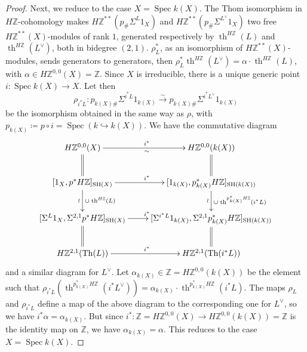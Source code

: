 \documentclass[10pt]{amsart}
\theoremstyle{definition}
\theoremstyle{plain}
\numberwithin{equation}{section}
\newcommand{\0}{\emptyset}
\newcommand{\Z}{{\mathbb Z}}
\newcommand{\Spec}{{\operatorname{Spec}}}
\newcommand{\SH}{{\operatorname{SH}}}
\newcommand{\Th}{{\operatorname{Th}}}
\renewcommand{\th}{{\operatorname{th}}}
\begin{document}
\begin{proof}
    Next, we reduce to the case $X=\Spec k(X)$. The Thom isomorphism in $H\mathbb{Z}$-cohomology makes $H\mathbb{Z}^{**}(p_{\#}\Sigma^L1_X)$ and $H\mathbb{Z}^{**}(p_{\#}\Sigma^{L^{\vee}}1_X)$ two free $H\mathbb{Z}^{**}(X)$-modules of rank $1$, generated respectively by $\th^{H\mathbb{Z}}(L)$ and $\th^{H\mathbb{Z}}(L^{\vee})$, both in bidegree $(2,1)$. $\rho_L^*$, as an isomorphism of $H\mathbb{Z}^{**}(X)$-modules, sends generators to generators, then $\rho_L^*\th^{H\mathbb{Z}}(L^{\vee})=\alpha \cdot \th^{H\mathbb{Z}}(L)$, with $\alpha \in H\mathbb{Z}^{0,0}(X)=\mathbb{Z}.$ Since $X$ is irreducible, there is a unique generic point $i:\Spec k(X) \to X$. Let then
    $$\rho_{i^*L}: p_{k(X)\#}\Sigma^{i^*L}1_{k(X)} \xrightarrow{\sim} p_{k(X)\#}\Sigma^{i^*L^{\vee}}1_{k(X)}$$
    be the isomorphism obtained in the same way as $\rho$, with $p_{k(X)}\coloneqq p \circ i =\Spec(k \hookrightarrow k(X))$. We have the commutative diagram
\[
 \xymatrix{
 H\Z^{0,0}(X)\ar@{=}[d]\ar[r]^{i^*}_\sim&H\Z^{0,0}(k(X))\ar@{=}[d]\\
  [1_X, p^*H\Z]_{\SH(X)}\ar[r]^{i^*}\ar[d]_\wr^{\cup \; \th^{H\mathbb{Z}}(L)}&[1_{k(X)}, p_{k(X)}^*H\Z]_{\SH(k(X))}\ar[d]_\wr^{\cup \; \th^{p_{k(X)}^*H\mathbb{Z}}(i^*L)}\\
 [\Sigma^L1_X, \Sigma^{2,1}p^*H\Z]_{\SH(X)}\ar@{=}[d]\ar[r]^{i^*}&[\Sigma^{i^*L}1_{k(X)}, \Sigma^{2,1}p_{k(X)}^*H\Z]_{\SH(k(X))}\ar@{=}[d]\\
 H\Z^{2,1}(\Th(L))\ar[r]^{i^*}&H\Z^{2,1}(\Th(i^*L)) 
 }
 \]
 and a similar diagram for $L^\vee$. Let $\alpha_{k(X)}\in \Z=H\Z^{0,0}(k(X))$ be the element such that $\rho_{i^*L}(\th^{p_{k(X)}^*H\mathbb{Z}}(i^*L^{\vee}))=\alpha_{k(X)} \cdot \th^{p_{k(X)}^*H\mathbb{Z}}(i^*L)$. The maps $\rho_L$ and $\rho_{i^*L}$ define a map of the above diagram to the corresponding one for $L^\vee$, so we have $i^*\alpha=\alpha_{k(X)}$. But since $i^*:\Z=H\Z^{0,0}(X)\to H\Z^{0,0}(k(X))=\Z$ is the identity map on $\Z$, we have $\alpha_{k(X)}=\alpha$. This reduces to the case $X =\Spec k(X)$. 
 

\end{proof}
\end{document}

